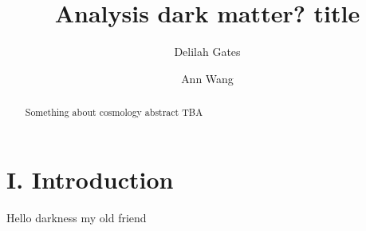 \documentclass[aps,prl,reprint]{revtex4-1}
\begin{document}

\title{	Analysis dark matter? title}
\author{Delilah Gates}
\author{Ann Wang}
\begin{abstract}
Something about cosmology abstract TBA
\end{abstract}
\maketitle
\section{I. Introduction}
Hello darkness my old friend
 
\end{document}
